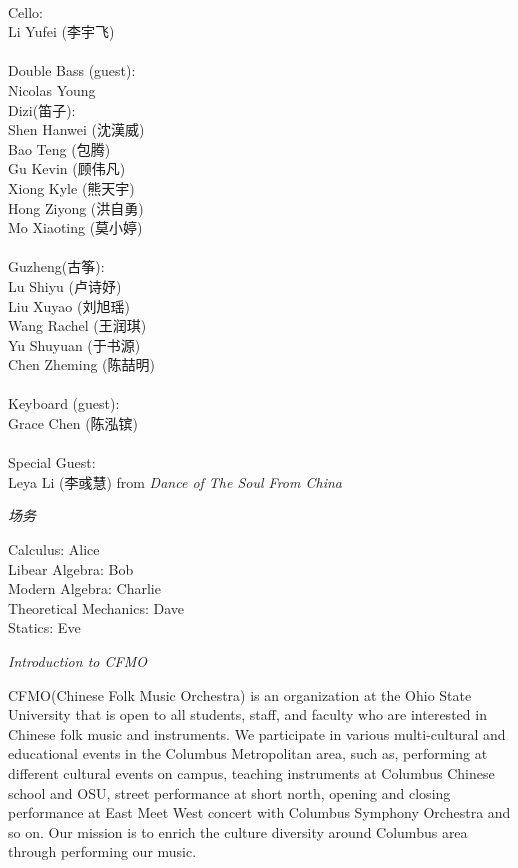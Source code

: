 \documentclass[letter,6pt,poets]{ConcProg}
\begin{document}
\begin{spacing}{0.85}
\begin{multicols}{2}
\\
Cello:\\
Li Yufei (李宇飞)\\
\\
Double Bass (guest):\\
Nicolas Young\\

Dizi(笛子): 				 \\    
Shen Hanwei		(沈漢威)     \\
Bao Teng  (包腾)\\
Gu Kevin   (顾伟凡)               \\
Xiong Kyle (熊天宇)\\
Hong Ziyong (洪自勇)\\
Mo Xiaoting (莫小婷)\\
\\
Guzheng({古筝}):\\
Lu Shiyu (卢诗妤)\\
Liu Xuyao  (刘旭瑶)\\               
Wang Rachel (王润琪) \\
Yu Shuyuan   (于书源)\\
Chen Zheming  (陈喆明)\\
\\
Keyboard (guest):\\
Grace Chen (陈泓镔)
\\
\\
Special Guest:\\
Leya Li (李彧慧)
 \small{ from \emph{ Dance of The Soul From China}}
\\
\end{multicols}
\begin{center}
\Large\textsl{ 场务}
\end{center}
\begin{multicols}{2}%
Calculus: Alice\\
Libear Algebra: Bob\\
Modern Algebra: Charlie\\
Theoretical Mechanics: Dave\\
Statics: Eve



\end{multicols}
\begin{center}
\Large\textsl{ Introduction to CFMO}
\end{center}

CFMO(Chinese Folk Music Orchestra) is an organization at the Ohio State University that is open to all students, staff, and faculty who are interested in Chinese folk music and instruments. We participate in various multi-cultural and educational events in the Columbus Metropolitan area, such as, performing at different cultural events on campus, teaching instruments at Columbus Chinese school and OSU, street performance at short north, opening and closing performance at East Meet West concert with Columbus Symphony Orchestra and so on. Our mission is to enrich the culture diversity around Columbus area through performing our music.
\end{spacing}
\end{document}
